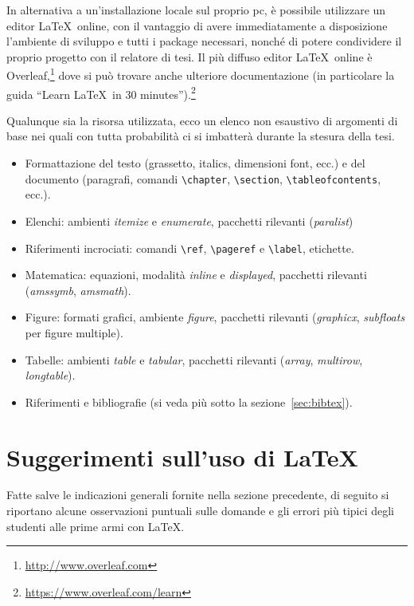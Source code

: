 \documentclass[12pt,italian]{report}
\begin{document}
In alternativa a un'installazione locale sul proprio pc, \`e possibile utilizzare un editor \LaTeX\ online, con il vantaggio di avere immediatamente a disposizione l'ambiente di sviluppo e tutti i package necessari, nonch\'e di potere condividere il proprio progetto con il relatore di tesi. Il pi\`u diffuso editor \LaTeX\ online \`e Overleaf,\footnote{\url{http://www.overleaf.com}} dove si pu\`o trovare anche ulteriore documentazione (in particolare la guida ``Learn \LaTeX\ in 30 minutes'').\footnote{\url{https://www.overleaf.com/learn}}

Qualunque sia la risorsa utilizzata, ecco un elenco non esaustivo di argomenti di base nei quali con tutta probabilit\`a ci si imbatter\`a durante la stesura della tesi.
\begin{itemize}
\item Formattazione del testo (grassetto, italics, dimensioni font, ecc.) e del documento (paragrafi, comandi \verb|\chapter|, \verb|\section|, \verb|\tableofcontents|, ecc.).
\item Elenchi: ambienti {\em itemize} e {\em enumerate}, pacchetti rilevanti ({\em paralist})
\item Riferimenti incrociati: comandi \verb|\ref|, \verb|\pageref| e \verb|\label|, etichette.
\item Matematica: equazioni, modalit\`a {\em inline} e {\em displayed}, pacchetti rilevanti ({\em amssymb}, {\em amsmath}).
\item Figure: formati grafici, ambiente {\em figure}, pacchetti rilevanti ({\em graphicx}, {\em subfloats} per figure multiple).
\item Tabelle: ambienti {\em table} e {\em tabular}, pacchetti rilevanti ({\em array}, {\em multirow}, {\em longtable}).
\item Riferimenti e bibliografie (si veda pi\`u sotto la sezione~\ref{sec:bibtex}).
\end{itemize}

\section{Suggerimenti sull'uso di \LaTeX}
\label{sec:consigli_latex}

Fatte salve le indicazioni generali fornite nella sezione precedente, di seguito si riportano alcune osservazioni puntuali sulle domande e gli errori pi\`u tipici degli studenti alle prime armi con \LaTeX.
\end{document}
